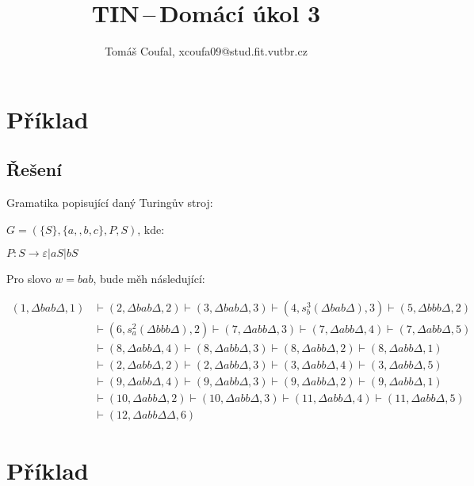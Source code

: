 \documentclass[11pt, a4paper]{article}
\title{TIN\,--\,Domácí úkol 3}
\author{Tomáš Coufal, xcoufa09@stud.fit.vutbr.cz}
\begin{document}
\maketitle
\section{Příklad}
\subsection*{Řešení}
Gramatika popisující daný Turingův stroj:

\noindent $G = (\{S\}, \{a, ,b, c\}, P, S) $, kde:

$ P: S \rightarrow \varepsilon | aS | bS$

\noindent Pro slovo $w = bab$, bude měh následující:

\noindent
$\begin{aligned}
	(1, \Delta bab \Delta, 1) & \vdash (2, \Delta bab \Delta, 2) \vdash (3, \Delta bab \Delta, 3) \vdash (4, s_b^3(\Delta bab \Delta), 3) \vdash (5, \Delta bbb \Delta, 2) \\
	                          & \vdash (6, s_a^2(\Delta bbb \Delta), 2) \vdash (7, \Delta abb \Delta, 3) \vdash (7, \Delta abb \Delta, 4) \vdash (7, \Delta abb \Delta, 5) \\
	                          & \vdash (8, \Delta abb \Delta, 4) \vdash (8, \Delta abb \Delta, 3)  \vdash (8, \Delta abb \Delta, 2) \vdash (8, \Delta abb \Delta, 1)       \\
	                          & \vdash (2, \Delta abb \Delta, 2) \vdash (2, \Delta abb \Delta, 3) \vdash (3, \Delta abb \Delta, 4) \vdash (3, \Delta abb \Delta, 5)        \\
	                          & \vdash (9, \Delta abb \Delta, 4) \vdash (9, \Delta abb \Delta, 3) \vdash (9, \Delta abb \Delta, 2) \vdash (9, \Delta abb \Delta, 1)        \\
	                          & \vdash (10, \Delta abb \Delta, 2) \vdash (10, \Delta abb \Delta, 3) \vdash (11, \Delta abb \Delta, 4) \vdash (11, \Delta abb \Delta, 5)    \\
	                          & \vdash (12, \Delta abb \Delta \Delta, 6)
\end{aligned}$


\clearpage
\maketitle
\section{Příklad}
\end{document}
